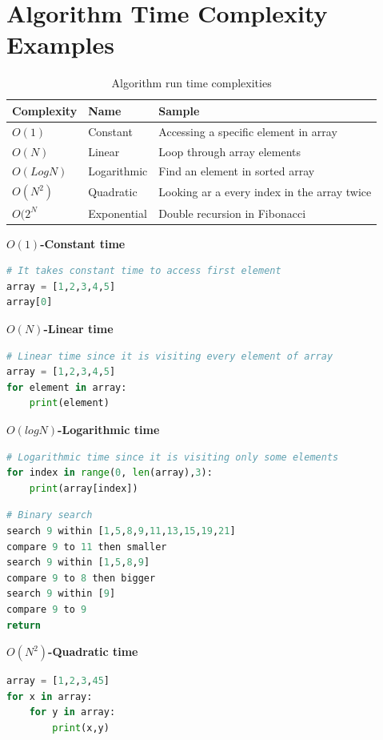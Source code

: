 \documentclass[10pt,letterpaper]{article}
\begin{document}
\section{Algorithm Time Complexity Examples}

\begin{table}[hbtp]
\caption{Algorithm run time complexities}
\centering
\begin{tabular}{|l|l|l|}
\hline
\textbf{Complexity}&\textbf{Name}&\textbf{Sample}\\
\hline
$O(1)$ & Constant & Accessing a specific element in array \\
\hline
$O(N)$ & Linear & Loop through array elements \\
\hline
$O(LogN)$ & Logarithmic & Find an element in sorted array \\
\hline
$O(N^{2})$ & Quadratic & Looking ar a every index in the array twice \\
\hline
$O(2^{N}$ & Exponential & Double recursion in Fibonacci\\
\hline
\end{tabular}
\end{table}

\textbf{$O(1)$-Constant time}
\begin{lstlisting}[language=Python]
# It takes constant time to access first element
array = [1,2,3,4,5]
array[0] 
\end{lstlisting}

\textbf{$O(N)$-Linear time}
\begin{lstlisting}[language=Python]
# Linear time since it is visiting every element of array
array = [1,2,3,4,5]
for element in array:
	print(element)
\end{lstlisting}

\textbf{$O(logN)$-Logarithmic time}
\begin{lstlisting}[language=Python]
# Logarithmic time since it is visiting only some elements
for index in range(0, len(array),3):
	print(array[index])
\end{lstlisting}
\begin{lstlisting}[language=Python]
# Binary search
search 9 within [1,5,8,9,11,13,15,19,21]
compare 9 to 11 then smaller
search 9 within [1,5,8,9]
compare 9 to 8 then bigger
search 9 within [9]
compare 9 to 9
return 
\end{lstlisting}

\textbf{$O(N^{2})$-Quadratic time}
\begin{lstlisting}[language=Python]
array = [1,2,3,45]
for x in array:
	for y in array:
		print(x,y)
\end{lstlisting}
\end{document}
